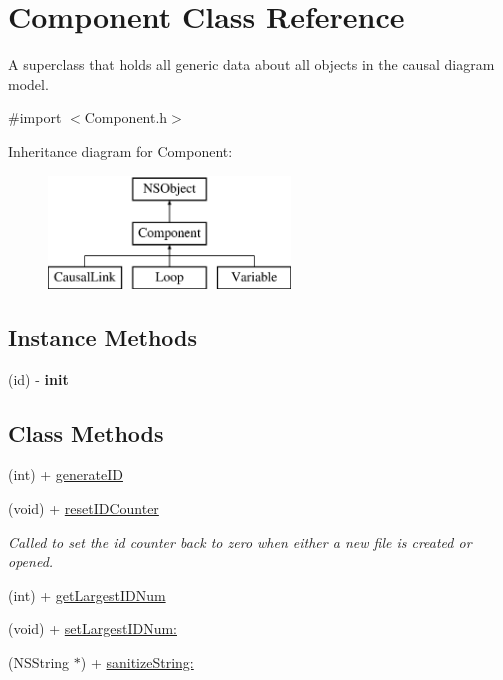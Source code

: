 \hypertarget{interface_component}{\section{Component Class Reference}
\label{interface_component}
}


A superclass that holds all generic data about all objects in the causal diagram model.  




{\ttfamily \#import $<$Component.\-h$>$}

Inheritance diagram for Component\-:\begin{figure}[H]
\begin{center}
\leavevmode
\includegraphics[height=3.000000cm]{interface_component}
\end{center}
\end{figure}
\subsection*{Instance Methods}
\begin{DoxyCompactItemize}
\item 
\hypertarget{interface_component_a4213bb26f5207ee3f402fe463badc691}{(id) -\/ {\bfseries init}}\label{interface_component_a4213bb26f5207ee3f402fe463badc691}

\end{DoxyCompactItemize}
\subsection*{Class Methods}
\begin{DoxyCompactItemize}
\item 
(int) + \hyperlink{interface_component_a3d13675a50c2e37e16e1b7858e5510e4}{generate\-I\-D}
\item 
\hypertarget{interface_component_a729723fbabf97aacfb842008ac0a354a}{(void) + \hyperlink{interface_component_a729723fbabf97aacfb842008ac0a354a}{reset\-I\-D\-Counter}}\label{interface_component_a729723fbabf97aacfb842008ac0a354a}

\begin{DoxyCompactList}\small\item\em Called to set the id counter back to zero when either a new file is created or opened. \end{DoxyCompactList}\item 
(int) + \hyperlink{interface_component_a5dd925a5e48c04cad74e8beb21d293ff}{get\-Largest\-I\-D\-Num}
\item 
(void) + \hyperlink{interface_component_ae07661532eb80738c2008859e8a198b7}{set\-Largest\-I\-D\-Num\-:}
\item 
(N\-S\-String $\ast$) + \hyperlink{interface_component_a875d9dcfa3e019c2cf685524707e0427}{sanitize\-String\-:}
\end{DoxyCompactItemize}

